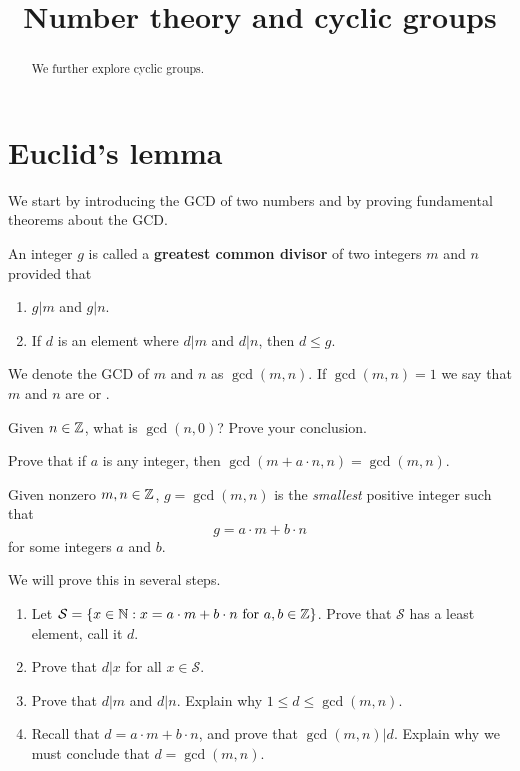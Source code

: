 \documentclass{ximera}
\title{Number theory and cyclic groups}
\begin{document}
\begin{abstract}
  We further explore cyclic groups.
\end{abstract}
\maketitle


\section{Euclid's lemma}

We start by introducing the GCD of two numbers and by proving
fundamental theorems about the GCD.


\begin{definition} 
An integer $g$ is called a \textbf{greatest common divisor} of two
integers $m$ and $n$ provided that
\begin{enumerate}
\item $g| m$ and $g | n$.
\item If $d$ is an element where $d| m$ and $d | n$, then $d\le g$.
\end{enumerate}
We denote the GCD of $m$ and $n$ as $\gcd(m,n)$. If $\gcd(m,n) = 1$ we
say that $m$ and $n$ are  or .
\end{definition}


\begin{exercise} 
Given $n\in \mathbb Z$, what is $\gcd(n,0)$? Prove your conclusion.
\end{exercise}

\begin{exercise} 
Prove that if $a$ is any integer, then $\gcd(m + a\cdot n, n) =
\gcd(m, n)$.
\end{exercise}




\begin{theorem}\label{T:EL1}
  Given nonzero $m,n\in\mathbb Z$, $g=\gcd(m,n)$ is the \textit{smallest}
  positive integer such that
  \[
  g = a\cdot m +b\cdot n
  \]
  for some integers $a$ and $b$.
  \begin{sketch} We will prove this in several steps.
  \begin{enumerate}
  \item Let $\mathcal S = \{x\in \mathbb N: x = a\cdot m +b\cdot n\text{ for } a,b\in
    \mathbb Z\}$. Prove that $\mathcal S$ has a least element, call it $d$.
  \item Prove that $d| x$ for all $x\in \mathcal S$.
  \item Prove that $d| m$ and $d| n$. Explain why $1 \le d \le \gcd(m,n)$.
  \item Recall that $d = a\cdot m +b\cdot n$, and prove that $\gcd(m,n) |
    d$. Explain why we must conclude that $d = \gcd(m,n)$.
  \end{enumerate}
  \end{sketch}
\end{theorem}
\end{document}
